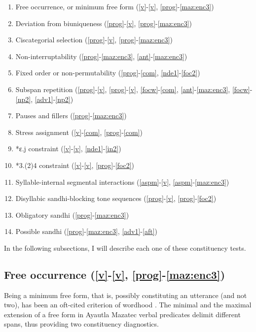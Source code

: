 \documentclass[output=paper]{langscibook}
\begin{document}
\begin{enumerate}
    \item Free occurrence, or minimum free form (\ref{v}-\ref{v}, \ref{prog}-\ref{maz:enc3})
    \item Deviation from biuniqueness (\ref{prog}-\ref{v}, \ref{prog}-\ref{maz:enc3})
    \item Ciscategorial selection (\ref{prog}-\ref{v}, \ref{prog}-\ref{maz:enc3})
    \item Non-interruptability (\ref{prog}-\ref{maz:enc3}, \ref{ant}-\ref{maz:enc3})
    \item Fixed order or non-permutability (\ref{prog}-\ref{com}, \ref{nde1}-\ref{foc2})
    \item Subspan repetition (\ref{prog}-\ref{v}, \ref{prog}-\ref{v}, \ref{focw}-\ref{com}, \ref{ant}-\ref{maz:enc3}, \ref{focw}-\ref{np2}, \ref{adv1}-\ref{np2})
    \item Pauses and fillers (\ref{prog}-\ref{maz:enc3})
    \item Stress assignment (\ref{v}-\ref{com}, \ref{prog}-\ref{com})
    \item *ɛ.j constraint (\ref{v}-\ref{v}, \ref{nde1}-\ref{in2})
    \item *3.(2)4 constraint (\ref{v}-\ref{v}, \ref{prog}-\ref{foc2})
    \item Syllable-internal segmental interactions (\ref{aspm}-\ref{v}, \ref{aspm}-\ref{maz:enc3})
    \item Disyllabic sandhi-blocking tone sequences (\ref{prog}-\ref{v}, \ref{prog}-\ref{foc2})
    \item Obligatory sandhi (\ref{prog}-\ref{maz:enc3})
    \item Possible sandhi (\ref{prog}-\ref{maz:enc3}, \ref{adv1}-\ref{aft})
\end{enumerate}

In the following subsections, I will describe each one of these constituency tests.

\subsection{Free occurrence (\ref{v}-\ref{v}, \ref{prog}-\ref{maz:enc3})}\label{sec:d:free}
Being a minimum free form, that is, possibly constituting an utterance (and not two), has been an oft-cited criterion of wordhood \citep[cf.][39]{haspelmathword:2011}. The minimal and the maximal extension of a free form in Ayautla Mazatec verbal predicates delimit different spans, thus providing two constituency diagnostics.
\end{document}
